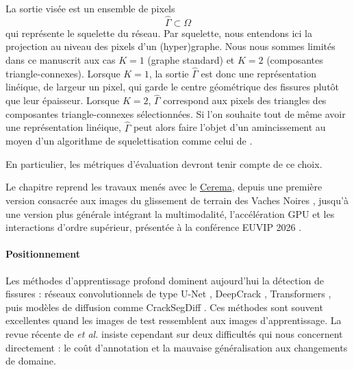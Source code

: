 La sortie visée est un ensemble de pixels
\[
    \widehat\Gamma \subset \Omega
\]
qui représente le squelette du réseau. Par squelette, nous entendons ici  la projection au niveau des pixels d'un (hyper)graphe. Nous nous sommes limités dans ce manuscrit aux cas $K=1$ (graphe standard) et $K=2$ (composantes triangle-connexes).
Lorsque $K=1$, la sortie $\widehat \Gamma$ est donc une représentation linéique, de largeur un pixel, qui garde le centre géométrique des fissures plutôt que leur épaisseur. 
Lorsque $K=2$, $\widehat \Gamma$ correspond aux pixels des triangles des composantes triangle-connexes sélectionnées. Si l'on souhaite tout de même avoir une représentation linéique, $\widehat \Gamma$ peut alors faire l'objet d'un amincissement au moyen d'un algorithme de squelettisation comme celui de  \cite{Lee1994, SciKitSkeletonization}. 


En particulier, les métriques d'évaluation devront tenir compte de ce choix. %

Le chapitre reprend les travaux menés avec le \href{https://www.cerema.fr/fr/mots-cles/equipe-recherche-endsum}{Cerema}, depuis une première version consacrée aux images du glissement de terrain des Vaches Noires \cite{BibiStrasbourg}, jusqu'à une version plus générale intégrant la multimodalité, l'accélération GPU et les interactions d'ordre supérieur, présentée à la conférence EUVIP 2026 \cite{BibiISPRS}.

\paragraph{Positionnement}
Les méthodes d'apprentissage profond dominent aujourd'hui la détection de fissures : réseaux convolutionnels de type U-Net \cite{Unet2015}, DeepCrack \cite{DeepCrack2019}, Transformers \cite{CrackFormer2021}, puis modèles de diffusion comme CrackSegDiff \cite{CrackSegDiff2024}. Ces méthodes sont souvent excellentes quand les images de test ressemblent aux images d'apprentissage. La revue récente de  \emph{et al.} \cite{Zhang2025Review} insiste cependant sur deux difficultés qui nous concernent directement : le coût d'annotation et la mauvaise généralisation aux changements de domaine. %


